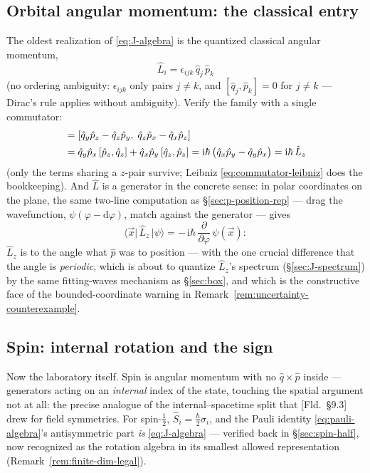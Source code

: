 \documentclass[11pt]{article}
\theoremstyle{plain}
\theoremstyle{definition}
\theoremstyle{remark}
\newcommand{\dd}{\mathrm{d}}
\newcommand{\ii}{\mathrm{i}}
\newcommand{\pd}[2]{\frac{\partial #1}{\partial #2}}
\newcommand{\vx}{\vec{x}}
\newcommand{\op}[1]{\hat{#1}}
\newcommand{\ket}[1]{\lvert #1 \rangle}
\newcommand{\bra}[1]{\langle #1 \rvert}
\begin{document}
\subsection{Orbital angular momentum: the classical entry}
\label{sec:orbital}

The oldest realization of \eqref{eq:J-algebra} is the quantized
classical angular momentum,
\begin{equation}
  \op L_i = \epsilon_{ijk}\,\op q_j\,\op p_k
\end{equation}
(no ordering ambiguity: $\epsilon_{ijk}$ only pairs $j \ne k$, and
$[\op q_j, \op p_k] = 0$ for $j \ne k$ --- Dirac's rule applies
without ambiguity). Verify the family with a single commutator:
\begin{align}
  [\op L_x, \op L_y]
  &= [\op q_y\op p_z - \op q_z\op p_y,\;
      \op q_z\op p_x - \op q_x\op p_z]
  \notag\\
  &= \op q_y\op p_x\,[\op p_z, \op q_z]
   + \op q_x\op p_y\,[\op q_z, \op p_z]
  = \ii\hbar\,\bigl(\op q_x\op p_y - \op q_y\op p_x\bigr)
  = \ii\hbar\,\op L_z
\end{align}
(only the terms sharing a $z$-pair survive; Leibniz
\eqref{eq:commutator-leibniz} does the bookkeeping). And $\op L$
is a generator in the concrete sense: in polar coordinates on
the plane, the same two-line computation as
\S\ref{sec:p-position-rep} --- drag the wavefunction,
$\psi(\varphi - \dd\varphi)$, match against the generator --- gives
\begin{equation}
  \bra{\vx}\,\op L_z\,\ket\psi
  = -\,\ii\hbar\,\pd{}{\varphi}\,\psi(\vx) :
  \label{eq:Lz-polar}
\end{equation}
$\op L_z$ is to the angle what $\op p$ was to position --- with the
one crucial difference that the angle is \emph{periodic}, which is
about to quantize $\op L_z$'s spectrum (\S\ref{sec:J-spectrum}) by
the same fitting-waves mechanism as \S\ref{sec:box}, and which is
the constructive face of the bounded-coordinate warning in
Remark~\ref{rem:uncertainty-counterexample}.

\subsection{Spin: internal rotation and the sign}
\label{sec:spin-formalized}

Now the laboratory itself. Spin is angular momentum with no
$\op q\times\op p$ inside --- generators acting on an
\emph{internal} index of the state, touching the spatial argument
not at all: the precise analogue of the internal--spacetime split
that [Fld.\ \S9.3] drew for field symmetries. For spin-$\tfrac12$,
$\op S_i = \tfrac\hbar2\sigma_i$, and the Pauli identity
\eqref{eq:pauli-algebra}'s antisymmetric part \emph{is}
\eqref{eq:J-algebra} --- verified back in \S\ref{sec:spin-half},
now recognized as the rotation algebra in its smallest allowed
representation (Remark~\ref{rem:finite-dim-legal}).
\end{document}
